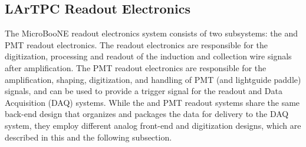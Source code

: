 %
%

\subsection{LArTPC Readout Electronics}
\label{sec:readoutelectronics}
The MicroBooNE readout electronics system consists of two subsystems: the \lartpc and PMT readout electronics. The \lartpc readout electronics are responsible for the digitization, processing and readout of the induction and collection wire signals after amplification. The PMT readout electronics are responsible for the amplification, shaping, digitization, and handling of PMT (and lightguide paddle) signals, and can be used to provide a trigger signal for the readout and Data Acquisition (DAQ) systems. While the \lartpc and PMT readout systems share the same back-end design that organizes and packages the data for delivery to the DAQ system, they employ different analog front-end and digitization designs, which are described in this and the following subsection.

